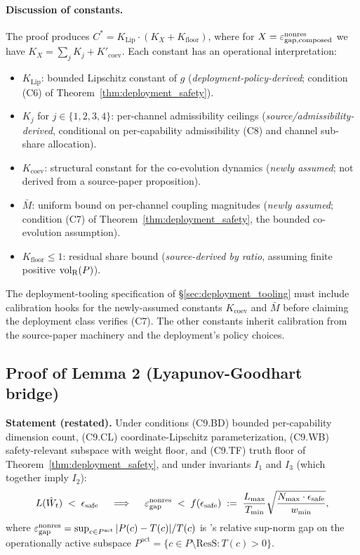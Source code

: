 \paragraph{Discussion of constants.}
The proof produces $C^* = K_{\mathrm{Lip}} \cdot (K_X +
K_{\mathrm{floor}})$, where for $X = \varepsilon_{\mathrm{gap},\mathrm{composed}}^{\mathrm{nonres}}$ we have
$K_X = \sum_j K_j + K'_{\mathrm{coev}}$.  Each constant has an
operational interpretation:
\begin{itemize}
\item $K_{\mathrm{Lip}}$: bounded Lipschitz constant of $g$
  (\emph{deployment-policy-derived}; condition (C6) of
  Theorem~\ref{thm:deployment_safety}).
\item $K_j$ for $j \in \{1,2,3,4\}$: per-channel admissibility
  ceilings (\emph{source/admissibility-derived}, conditional on
  per-capability admissibility (C8) and channel sub-share
  allocation).
\item $K_{\mathrm{coev}}$: structural constant for the co-evolution
  dynamics (\emph{newly assumed}; not derived from a source-paper
  proposition).
\item $\bar{M}$: uniform bound on per-channel coupling magnitudes
  (\emph{newly assumed}; condition (C7) of
  Theorem~\ref{thm:deployment_safety}, the bounded co-evolution
  assumption).
\item $K_{\mathrm{floor}} \leq 1$: residual share bound
  (\emph{source-derived by ratio}, assuming finite positive
  ${\operatorname{vol}_{\mathrm{R}}}(P)$).
\end{itemize}

The deployment-tooling specification of \S\ref{sec:deployment_tooling}
must include calibration hooks for the newly-assumed constants
$K_{\mathrm{coev}}$ and $\bar{M}$ before claiming the deployment
class verifies (C7).  The other constants inherit calibration from
the source-paper machinery and the deployment's policy choices.

\subsection{Proof of Lemma 2 (Lyapunov-Goodhart bridge)}
\label{app:proof_lem2}

\textbf{Statement (restated).}  Under conditions (C9.BD) bounded
per-capability dimension count, (C9.CL) coordinate-Lipschitz
parameterization, (C9.WB) safety-relevant subspace with weight
floor, and (C9.TF) truth floor of
Theorem~\ref{thm:deployment_safety}, and under invariants $I_1$ and
$I_3$ (which together imply $I_2$):
\[
  L(\hat{W}_t) \;<\; \epsilon_{\mathrm{safe}}
  \quad \implies \quad
  \varepsilon_{\mathrm{gap}}^{\mathrm{nonres}} \;<\; f(\epsilon_{\mathrm{safe}})
  \;:=\; \frac{L_{\max}}{T_{\min}}
  \sqrt{\frac{N_{\max} \cdot \epsilon_{\mathrm{safe}}}{w_{\min}}},
\]
where $\varepsilon_{\mathrm{gap}}^{\mathrm{nonres}} = \sup_{c \in P^{\mathrm{act}}} |P(c) - T(c)|/T(c)$
is \citep[Microfoundation]{lasser2026micro}'s relative sup-norm gap
on the operationally active subspace
$P^{\mathrm{act}} = \{c \in P \setminus \mathrm{ResS} : T(c) > 0\}$.

